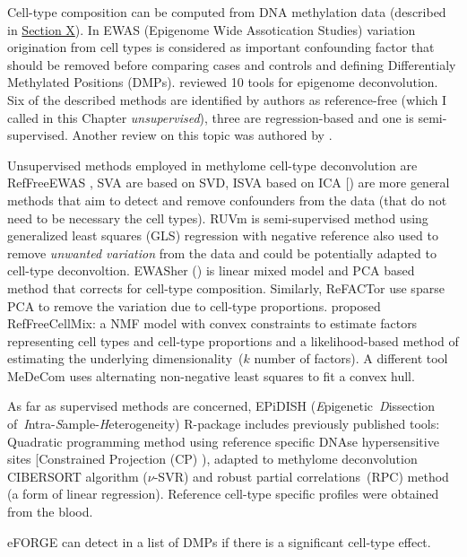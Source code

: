 \documentclass[12pt,]{book}
\theoremstyle{definition}
\theoremstyle{definition}
\theoremstyle{definition}
\theoremstyle{remark}
\begin{document}
Cell-type composition can be computed from DNA methylation data
(described in \protect\hyperlink{epi}{Section X}). In EWAS (Epigenome
Wide Assotication Studies) variation origination from cell types is
considered as important confounding factor that should be removed before
comparing cases and controls and defining Differentialy Methylated
Positions (DMPs). \citet{Teschendorff2017} reviewed 10 tools for
epigenome deconvolution. Six of the described methods are identified by
authors as reference-free (which I called in this Chapter
\emph{unsupervised}), three are regression-based and one is
semi-supervised. Another review on this topic was authored by
\citet{Titus2017}.

Unsupervised methods employed in methylome cell-type deconvolution are
RefFreeEWAS \citep{Houseman2014}, SVA \citep{Leek2007} are based on SVD,
ISVA based on ICA {[}\citet{Teschendorff2011}) are more general methods
that aim to detect and remove confounders from the data (that do not
need to be necessary the cell types). RUVm \citep{Maksimovic2015} is
semi-supervised method using generalized least squares (GLS) regression
with negative reference also used to remove \emph{unwanted variation}
from the data and could be potentially adapted to cell-type
deconvoltion. EWASher (\citet{Zou2014}) is linear mixed model and PCA
based method that corrects for cell-type composition. Similarly,
ReFACTor \citep{Rahmani2016} use sparse PCA to remove the variation due
to cell-type proportions. \citet{Houseman2016} proposed RefFreeCellMix:
a NMF model with convex constraints to estimate factors representing
cell types and cell-type proportions and a likelihood-based method of
estimating the underlying dimensionality~(\(k\) number of factors). A
different tool MeDeCom \citep{Lutsik2017} uses alternating non-negative
least squares to fit a convex hull.

As far as supervised methods are concerned, EPiDISH
(\emph{E}pigenetic~\emph{D}issection
of~\emph{I}ntra-\emph{S}ample-\emph{H}eterogeneity) R-package
\citep{Teschendorff2017} includes previously published tools: Quadratic
programming method using reference specific DNAse hypersensitive sites
{[}Constrained Projection (CP) \citep{Houseman2012}), adapted to
methylome deconvolution CIBERSORT algorithm (\(\nu\)-SVR) and robust
partial correlations~(RPC) method (a form of linear regression).
Reference cell-type specific profiles were obtained from the blood.

eFORGE \citep{Breeze2016} can detect in a list of DMPs if there is a
significant cell-type effect.
\end{document}

